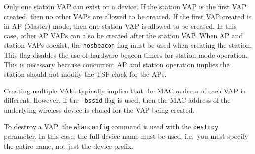 \documentclass[10pt,fullpage]{article}
\newcommand{\mytt}[1]{{\texttt{#1}}}
\begin{document}
Only one station VAP can exist on a device.  If the station VAP is the
first VAP created, then no other VAPs are allowed to be created. If
the first VAP created is in AP (Master) mode, then one station VAP is
allowed to be created.  In this case, other AP VAPs can also be
created after the station VAP.  When AP and station VAPs coexist, the
\mytt{nosbeacon} flag must be used when creating the station.  This
flag disables the use of hardware beacon timers for station mode
operation.  This is necessary because concurrent AP and station
operation implies the station should not modify the TSF clock for the
APs.

Creating multiple VAPs typically implies that the MAC address of each
VAP is different.  However, if the \mytt{-bssid} flag is used, then
the MAC address of the underlying wireless device is cloned for the
VAP being created.

To destroy a VAP, the \mytt{wlanconfig} command is used with the
\mytt{destroy} parameter.  In this case, the full device name must be
used, i.e.\ you must specify the entire name, not just the device
prefix.
\end{document}
